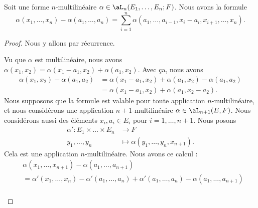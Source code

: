 \begin{lemma}	\label{LEMooGQWQooUfqURv}
	Soit une forme \( n\)-multilinéaire \( \alpha\in\aL_n(E_1,\ldots,E_n;F)\). Nous avons la formule
	\begin{equation}
		\alpha(x_1,\ldots,x_n)-\alpha(a_1,\ldots,a_n)=\sum_{i=1}^n\alpha(a_1,\ldots,a_{i-1},x_i-a_i,x_{i+1},\ldots,x_n).
	\end{equation}
\end{lemma}

\begin{proof}
	Nous y allons par récurrence.
	\begin{subproof}
		\spitem[\( n=2\)]
		Vu que \( \alpha\) est multilinéaire, nous avons \( \alpha(x_1,x_2)=\alpha(x_1-a_1,x_2)+\alpha(a_1,x_2)\). Avec ça, nous avons
		\begin{subequations}
			\begin{align}
				\alpha(x_1,x_2)-\alpha(a_1,a_2) & =\alpha(x_1-a_1,x_2)+\alpha(a_1,x_2)-\alpha(a_1,a_2) \\
				                                & =\alpha(x_1-a_1,x_2)+\alpha(a_1,x_2-a_2).
			\end{align}
		\end{subequations}
		\spitem[La récurrence]
		Nous supposons que la formule est valable pour toute application \( n\)-multilinéaire, et nous considérons une application \( n+1\)-multilinéaire \( \alpha\in\aL_{n+1}(E,F)\). Nous considérons aussi des éléments \( x_i, a_i\in E_i\) pour \( i=1,\ldots,n+1\). Nous posons
		\begin{equation}
			\begin{aligned}
				\alpha'\colon E_1\times\ldots\times E_n & \to F                                   \\
				y_1,\ldots,y_n                          & \mapsto \alpha(y_1,\ldots,y_n,x_{n+1}).
			\end{aligned}
		\end{equation}
		Cela est une application \( n\)-multilinéaire. Nous avons ce calcul :
		\begin{subequations}
			\begin{align}
				 & \alpha(x_1,  \ldots,x_{n+1})  -\alpha(a_1,\ldots,a_{n+1})      \nonumber                                                      \\& =\alpha'(x_1,\ldots,x_n)-\alpha'(a_1,\ldots,a_n)+\alpha'(a_1,\ldots,a_n)-\alpha(a_1,\ldots,a_{n+1}) \\

\end{align}
\end{subequations}
\end{subproof}
\end{proof}
